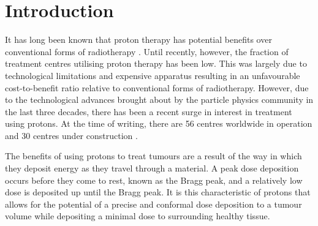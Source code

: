 \documentclass[11pt,a4paper]{article}
\begin{document}
{\let\newpage\relax}



\newpage
\doublespacing
\linenumbers
\section{Introduction}
It has long been known that proton therapy has potential benefits over conventional forms of radiotherapy \parencite{wilson1946radiological}. Until recently, however, the fraction of treatment centres utilising proton therapy has been low. This was largely due to technological limitations and expensive apparatus resulting in an unfavourable cost-to-benefit ratio relative to conventional forms of radiotherapy. However, due to the technological advances brought about by the particle physics community in the last three decades, there has been a recent surge in interest in treatment using protons. At the time of writing, there are 56 centres worldwide in operation and 30 centres under construction \parencite{ptcog}. 

The benefits of using protons to treat tumours are a result of the way in which they deposit energy as they travel through a material. 
A peak dose deposition occurs before they come to rest, known as the Bragg peak, and a relatively low dose is deposited up until the Bragg peak. It is this characteristic of protons that allows for the potential of a precise and conformal dose deposition to a tumour volume while depositing a minimal dose to surrounding healthy tissue. 
\end{document}
